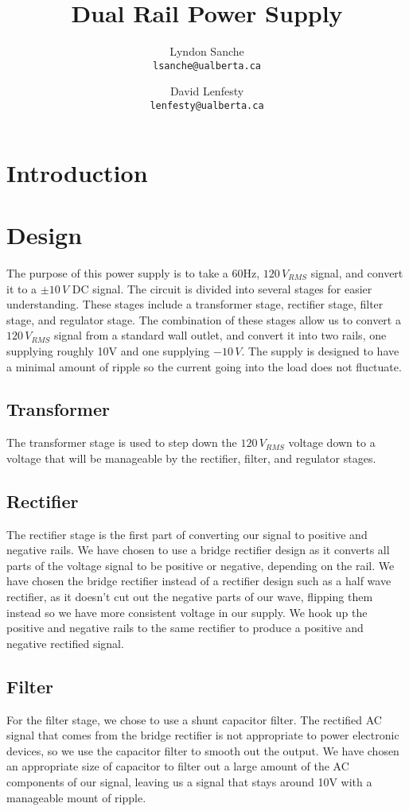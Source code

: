 \documentclass{article}
\title{Dual Rail Power Supply}
\author{
    Lyndon Sanche\\
    \texttt{lsanche@ualberta.ca}
    \and
    David Lenfesty\\
    \texttt{lenfesty@ualberta.ca}
}
\begin{document}
\maketitle
\newpage
\tableofcontents

\section{Introduction}

\section{Design}
The purpose of this power supply is to take a 60Hz, $120\,V_{RMS}$ signal, and convert it to a $\pm10\,V$ DC signal. The circuit is divided into
several stages for easier understanding. These stages include a transformer stage, rectifier stage, filter stage, and regulator stage. The combination 
of these stages allow us to convert a $120\,V_{RMS}$ signal from a standard wall outlet, and convert it into two rails, one supplying roughly 10V and one supplying $-10\,V$. 
The supply is designed to have a minimal amount of ripple so the current going into the load does not fluctuate.

\subsection{Transformer}
The transformer stage is used to step down the $120\,V_{RMS}$ voltage down to a voltage that will be manageable by the rectifier, filter, and regulator stages.

\subsection{Rectifier}
The rectifier stage is the first part of converting our signal to positive and negative rails. We have chosen to use a bridge rectifier design as it converts all parts of the voltage signal 
to be positive or negative, depending on the rail. We have chosen the bridge rectifier instead of a rectifier design such as a half wave rectifier, as it doesn't cut out 
the negative parts of our wave, flipping them instead so we have more consistent voltage in our supply. We hook up the positive and negative rails to the same rectifier to produce a 
positive and negative rectified signal.

\subsection{Filter}
For the filter stage, we chose to use a shunt capacitor filter. The rectified AC signal that comes from the bridge rectifier is not appropriate to power electronic devices, so 
we use the capacitor filter to smooth out the output. We have chosen an appropriate size of capacitor to filter out a large amount of the AC components of our signal, leaving us a 
signal that stays around 10V with a manageable mount of ripple.
\end{document}
